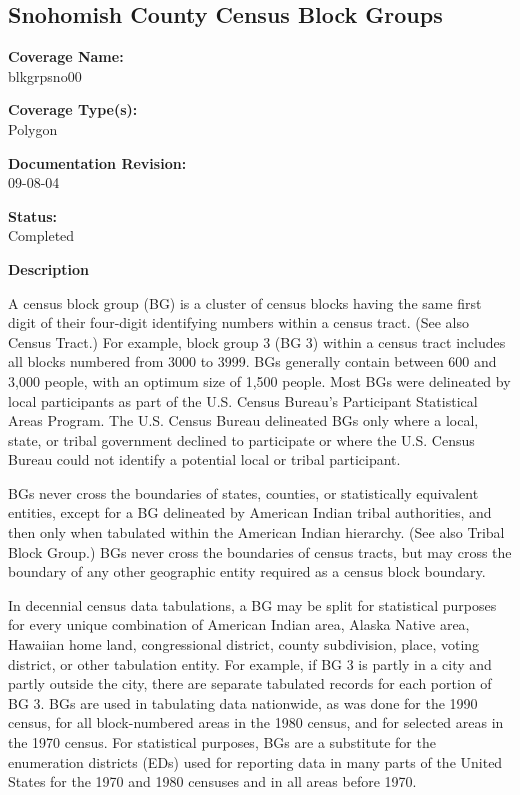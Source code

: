 \begin{landscape}
\begin{longtable}{llrrrrrc}

\end{longtable}
\end{landscape}
\newpage

\subsection{Snohomish County Census Block Groups}
{\bf \large Coverage Name:}\\
blkgrpsno00

{\bf \large Coverage Type(s):}\\
Polygon

{\bf \large Documentation Revision:}\\
09-08-04

{\bf \large Status:}\\
Completed

{\bf \large Description}

A census block group (BG) is a cluster of census blocks having the
same first digit of their four-digit identifying numbers within a
census tract. (See also Census Tract.) For example, block group 3
(BG 3) within a census tract includes all blocks numbered from
3000 to 3999. BGs generally contain between 600 and 3,000 people,
with an optimum size of 1,500 people. Most BGs were delineated by
local participants as part of the U.S. Census Bureau's Participant
Statistical Areas Program. The U.S. Census Bureau delineated BGs
only where a local, state, or tribal government declined to
participate or where the U.S. Census Bureau could not identify a
potential local or tribal participant.

BGs never cross the boundaries of states, counties, or
statistically equivalent entities, except for a BG delineated by
American Indian tribal authorities, and then only when tabulated
within the American Indian hierarchy. (See also Tribal Block
Group.) BGs never cross the boundaries of census tracts, but may
cross the boundary of any other geographic entity required as a
census block boundary.

In decennial census data tabulations, a BG may be split for
statistical purposes for every unique combination of American
Indian area, Alaska Native area, Hawaiian home land, congressional
district, county subdivision, place, voting district, or other
tabulation entity. For example, if BG 3 is partly in a city and
partly outside the city, there are separate tabulated records for
each portion of BG 3. BGs are used in tabulating data nationwide,
as was done for the 1990 census, for all block-numbered areas in
the 1980 census, and for selected areas in the 1970 census. For
statistical purposes, BGs are a substitute for the enumeration
districts (EDs) used for reporting data in many parts of the
United States for the 1970 and 1980 censuses and in all areas
before 1970.

